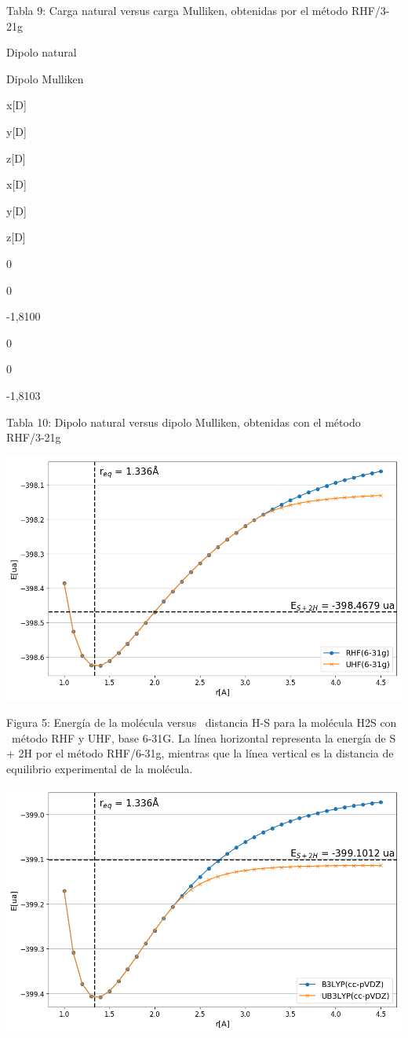 \documentclass[]{article}
\begin{document}
{Tabla 9}{: Carga natural versus carga Mulliken, obtenidas por el método
RHF/3-21g}

{}

\protect\hypertarget{t.89d0007008d0fd90d12bdec7c4c69a3f3ff6fa71}{}{}\protect\hypertarget{t.9}{}{}

{Dipolo natural}

{Dipolo Mulliken}

{x{[}D{]}}

{y{[}D{]}}

{z{[}D{]}}

{x{[}D{]}}

{y{[}D{]}}

{z{[}D{]}}

{0}

{0}

{-}{1,8100}

{0}

{0}

{-1,8103}

{Tabla 10: }{Dipolo natural versus dipolo Mulliken, obtenidas con el
método RHF/3-21g}

{}

{\includegraphics{images/image7.png}}

{Figura 5: }{Energía de la molécula versus ~distancia H-S para la
molécula H}{2}{S con ~método RHF y UHF, base 6-31G. La línea horizontal
representa la energía de S + 2H por el método RHF/6-31g, mientras que la
línea vertical es la distancia de equilibrio experimental de la
molécula. }

{\includegraphics{images/image3.png}}
\end{document}
